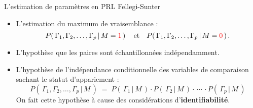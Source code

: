 
\begin{frame}{\large L'estimation de param\`etres en \Large PRL Fellegi-Sunter}

\large

\begin{itemize}
\pause\item
	L'estimation du maximum de vraisemblance :
	{\small
	\begin{equation*}
	P\!\left(\,\Gamma_{1},\Gamma_{2},\ldots,\Gamma_{p}\,\vert\,M={\color{red}1}\,\right)
	\quad\textnormal{et}\quad
	P\!\left(\,\Gamma_{1},\Gamma_{2},\ldots,\Gamma_{p}\,\vert\,M={\color{red}0}\,\right).
	\end{equation*}
	}
\pause\item
	\vskip -0.4cm
	L'hypoth\`ese que les paires sont \'echantillonn\'ees ind\'ependamment.
	\vskip 0.8cm
\pause\item
	L'hypoth\`ese de l'ind\'ependance conditionnelle des variables de comparaison sachant le statut d'appariement :
	{\small
	\begin{equation*}
	P\!\left(\,\Gamma_{1},\Gamma_{2},\ldots,\Gamma_{p}\,\vert\,M\,\right)
	\;=\;
	P\!\left(\,\Gamma_{1}\,\vert\,M\,\right)
	\cdot
	P\!\left(\,\Gamma_{2}\,\vert\,M\,\right)
	\cdot \,\cdots\, \cdot
	P\!\left(\,\Gamma_{p}\,\vert\,M\,\right)
	\end{equation*}
	}
	\pause\vskip -0.6cm
	{\small On fait cette hypoth\`ese \`a cause des consid\'erations d'\textbf{\color{red}identifiabilit\'e}.}
\end{itemize}

\end{frame}
\normalsize

